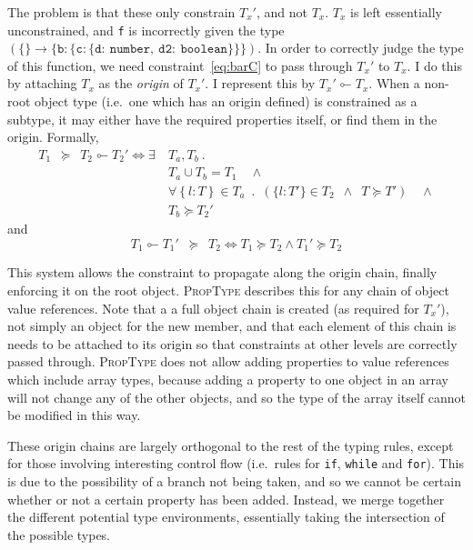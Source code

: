 \documentclass[12pt,a4paper,twoside,openright]{report}
\newcommand*{\js}{\texttt}
\newcommand*{\orig}{\ensuremath{\!\multimapinv\!}}
\begin{document}
The problem is that these only constrain $T_x'$, and not $T_x$. $T_x$ is
left essentially unconstrained, and \js{f} is incorrectly given the type
$\mathtt{(\mathtt{\{\} \rightarrow \{b:\{c:\{d:\ number,\ d2:\ boolean\}\}\}})}$. In order to
correctly judge the type of this function, we need constraint~\eqref{eq:barC}
to pass through $T_x'$ to $T_x$. I do this by attaching $T_x$ as the
\textit{origin} of $T_x'$. I represent this by $T_x'\orig T_x$. When a
non-root object type (i.e.~one which has an origin defined) is constrained as a
subtype, it may either have the required properties itself, or find them in the
origin. Formally,
\begin{equation}
 \begin{split}
	T_1\enspace \succeq\enspace T_2\orig T_2' \iff \exists\ & T_a, T_b\ .\\
	& T_a\cup T_b = T_1 \quad\land \\
	& \forall \left\{l: T\right\} \in T_a \enspace.\enspace (\{l: T'\}\in T_2\enspace \land \enspace T \succeq T') \quad\land \\
	& T_b \succeq T_2'
 \end{split}
\end{equation}
and
\begin{equation}
 T_1\orig T_1'\enspace \succeq \enspace T_2 \iff T_1\succeq T_2 \land T_1' \succeq T_2
\end{equation}

This system allows the constraint to propagate along the origin chain, finally
enforcing it on the root object. \textsc{PropType} describes this for any chain of
object value references. Note that a a full object chain is created (as
required for $T_x'$), not simply an object for the new member, and that each
element of this chain is needs to be attached to its origin so that constraints
at other levels are correctly passed through. \textsc{PropType} does not allow adding
properties to value references which include array types, because adding a
property to one object in an array will not change any of the other objects,
and so the type of the array itself cannot be modified in this way.

These origin chains are largely orthogonal to the rest of the typing rules,
except for those involving interesting control flow (i.e.~rules for
\js{if}, \js{while} and \js{for}). This is due to the possibility
of a branch not being taken, and so we cannot be certain whether or not a
certain property has been added. Instead, we merge together the different
potential type environments, essentially taking the intersection of the
possible types.
\end{document}
